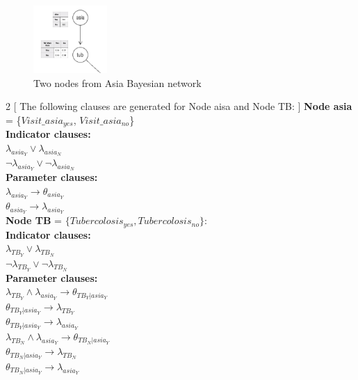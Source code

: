             \begin{figure}[h]
            \centering
            \includegraphics[width=0.25\textwidth]{pic/asia-tub.png}
            \caption{Two nodes from Asia Bayesian network}
            \label{fig:asia-tub}
            \end{figure}
            \newpage
            \begin{multicols}{2}
            [
            \noindent The following clauses are generated for Node aisa and Node TB:
            ]
            \noindent \textbf{Node asia} = \{$Visit\_asia_{yes}$, $Visit\_asia_{no}$\}\\
            \newline
            \textbf{Indicator clauses:}\\
            $\lambda_{asia_{Y}} \vee \lambda_{asia_{N}}$\\
            $\neg \lambda_{asia_{Y}} \vee \neg\lambda_{asia_{N}}$\\
            \newline
            \textbf{Parameter clauses:}\\
            $\lambda_{asia_{Y}} \rightarrow \theta_{asia_{Y}}$\\
            $\theta_{asia_{Y}} \rightarrow \lambda_{asia_{Y}}$\\
            
            \columnbreak
            \noindent \textbf{Node TB} = $\{Tubercolosis_{yes}, Tubercolosis_{no}\}$:\\
            \newline
            \textbf{Indicator clauses:}\\
            $\lambda_{TB_{Y}} \vee \lambda_{TB_{N}}$\\
            $\neg \lambda_{TB_{Y}} \vee \neg\lambda_{TB_{N}}$\\
            \newline
            \textbf{Parameter clauses:}\\
            $\lambda_{TB_{Y}} \wedge \lambda_{asia_{Y}}\rightarrow \theta_{TB_{Y}|asia_{Y}}$\\
            $\theta_{TB_{Y}|asia_{Y}} \rightarrow \lambda_{TB_{Y}}$\\
            $\theta_{TB_{Y}|asia_{Y}} \rightarrow \lambda_{asia_{Y}}$\\
            $\lambda_{TB_{N}} \wedge \lambda_{asia_{Y}} \rightarrow \theta_{TB_{N}|asia_{Y}}$\\
            $\theta_{TB_{N}|asia_{Y}} \rightarrow \lambda_{TB_{N}}$\\
            $\theta_{TB_{N}|asia_{Y}} \rightarrow \lambda_{asia_{Y}}$\\
            \end{multicols}
            
